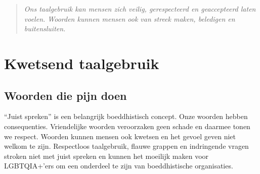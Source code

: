\documentclass[12pt,openany]{book}
\begin{document}
\newpage
\thispagestyle{empty}
\begin{figure}[h]
    \centering
\end{figure}

\begin{quote}
\centering
\textit{\Large Ons taalgebruik kan mensen zich veilig, gerespecteerd en geaccepteerd laten voelen. Woorden kunnen mensen ook van streek maken, beledigen en buitensluiten.}
\end{quote}

\chapter*{Kwetsend taalgebruik}

\section*{Woorden die pijn doen}

“Juist spreken” is een belangrijk boeddhistisch concept. Onze woorden hebben consequenties. Vriendelijke woorden veroorzaken geen schade en daarmee tonen we respect. Woorden kunnen mensen ook kwetsen en het gevoel geven niet welkom te zijn. Respectloos taalgebruik, flauwe grappen en indringende vragen stroken niet met juist spreken en kunnen het moeilijk maken voor LGBTQIA+’ers om een onderdeel te zijn van boeddhistische organisaties.
\end{document}
